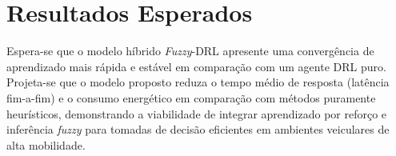 \chapter{Resultados Esperados}
\label{chap:resultados}

Espera-se que o modelo híbrido \textit{\textit{Fuzzy}}-\gls{DRL} apresente uma convergência de aprendizado mais rápida e estável em comparação com um agente \gls{DRL} puro. Projeta-se que o modelo proposto reduza o tempo médio de resposta (latência fim-a-fim) e o consumo energético em comparação com métodos puramente heurísticos, demonstrando a viabilidade de integrar aprendizado por reforço e inferência \textit{\textit{fuzzy}} para tomadas de decisão eficientes em ambientes veiculares de alta mobilidade.




